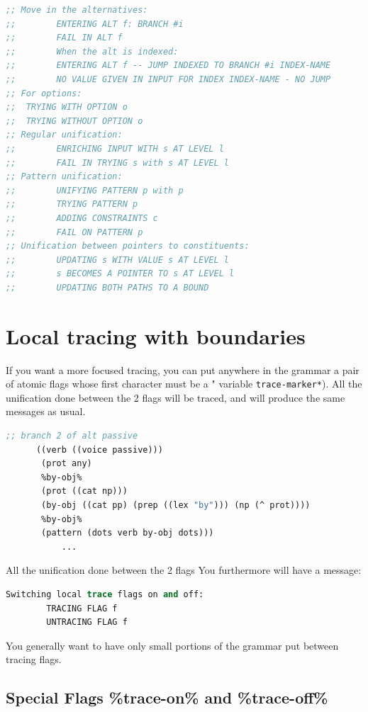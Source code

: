 \documentclass[10pt,a4paper]{report}
\begin{document}
\begin{lstlisting}[language=Lisp]
;; Move in the alternatives:
;;        ENTERING ALT f: BRANCH #i
;;        FAIL IN ALT f
;;        When the alt is indexed:
;;        ENTERING ALT f -- JUMP INDEXED TO BRANCH #i INDEX-NAME
;;        NO VALUE GIVEN IN INPUT FOR INDEX INDEX-NAME - NO JUMP
;; For options:
;;	TRYING WITH OPTION o
;;	TRYING WITHOUT OPTION o
;; Regular unification:
;;        ENRICHING INPUT WITH s AT LEVEL l
;;        FAIL IN TRYING s with s AT LEVEL l
;; Pattern unification:
;;        UNIFYING PATTERN p with p
;;        TRYING PATTERN p 
;;        ADDING CONSTRAINTS c
;;        FAIL ON PATTERN p
;; Unification between pointers to constituents:
;;        UPDATING s WITH VALUE s AT LEVEL l
;;        s BECOMES A POINTER TO s AT LEVEL l
;;        UPDATING BOTH PATHS TO A BOUND
\end{lstlisting}



\section{Local tracing with boundaries}

If you want a more focused tracing, you can put anywhere in the grammar
a pair of atomic flags whose first character must be a "%
variable {\tt *trace-marker*}). All the unification done between the 2 flags
will be traced, and will produce the same messages as usual.

\begin{lstlisting}[language=Lisp]
	  ;; branch 2 of alt passive
	  ((verb ((voice passive)))
	   (prot any)
	   %by-obj%
	   (prot ((cat np)))
	   (by-obj ((cat pp) (prep ((lex "by"))) (np (^ prot))))
	   %by-obj%
	   (pattern (dots verb by-obj dots)))
           ...
\end{lstlisting}

All the unification done between the 2 flags %
You furthermore will have a message:

\begin{lstlisting}[language=Lisp]
Switching local trace flags on and off:
        TRACING FLAG f
        UNTRACING FLAG f
\end{lstlisting}

You generally want to have only small portions of the grammar put between
tracing flags.

\subsection{Special Flags \%trace-on\% and \%trace-off\%}
\end{document}
